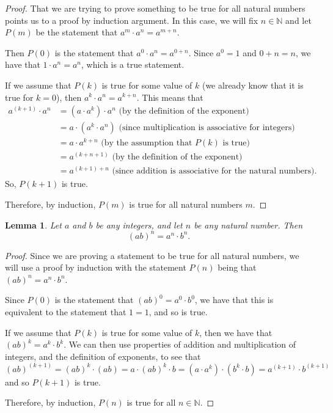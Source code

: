 \documentclass[
]{book}
\newtheorem{lemma}{Lemma}[chapter]
\theoremstyle{definition}
\theoremstyle{definition}
\theoremstyle{definition}
\theoremstyle{remark}
\begin{document}
\begin{proof}
{}That we are trying to prove something to be true for all natural numbers points us to a proof by induction argument. In this case, we will fix \(n\in \mathbb{N}\) and let \(P(m)\) be the statement that \(a^m\cdot a^n=a^{m+n}\).

Then \(P(0)\) is the statement that \(a^0\cdot a^n = a^{0+n}\). Since \(a^0=1\) and \(0+n=n\), we have that \(1\cdot a^n = a^n\), which is a true statement.

If we assume that \(P(k)\) is true for some value of \(k\) (we already know that it is true for \(k=0\)), then \(a^k\cdot a^n = a^{k+n}\). This means that
\begin{align*}
    a^{(k+1)} \cdot a^n & = (a \cdot a^k) \cdot a^n \mbox{ (by the definition of the exponent)} \\
    &= a \cdot (a^k\cdot a^n) \mbox{ (since multiplication is associative for integers)} \\
    &= a \cdot a^{k+n} \mbox{ (by the assumption that $P(k)$ is true)} \\
    &= a^{(k+n+1)} \mbox{ (by the definition of the exponent)} \\
    &= a^{(k+1)+n} \mbox{ (since addition is associative for the natural numbers)}.
\end{align*}
So, \(P(k+1)\) is true.

Therefore, by induction, \(P(m)\) is true for all natural numbers \(m\).
\end{proof}

\begin{lemma}
\protect\hypertarget{lem:unnamed-chunk-55}{}{\label{lem:unnamed-chunk-55} }Let \(a\) and \(b\) be any integers, and let \(n\) be any natural number. Then \[(ab)^n=a^n \cdot b^n.\]
\end{lemma}

\begin{proof}
{}Since we are proving a statement to be true for all natural numbers, we will use a proof by induction with the statement \(P(n)\) being that \((ab)^n=a^n\cdot b^n\).

Since \(P(0)\) is the statement that \((ab)^0=a^0 \cdot b^0\), we have that this is equivalent to the statement that \(1=1\), and so is true.

If we assume that \(P(k)\) is true for some value of \(k\), then we have that \((ab)^k=a^k\cdot b^k\). We can then use properties of addition and multiplication of integers, and the definition of exponents, to see that \[(ab)^{(k+1)}= (ab)^k\cdot (ab) = a\cdot (ab)^k \cdot b = (a\cdot a^k) \cdot (b^k\cdot b)  = a^{(k+1)} \cdot b^{(k+1)}\] and so \(P(k+1)\) is true.

Therefore, by induction, \(P(n)\) is true for all \(n\in \mathbb{N}\).
\end{proof}
\end{document}
